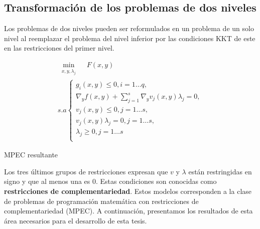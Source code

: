 \subsection{Transformación de los problemas de dos niveles}
		
		Los problemas de dos niveles pueden ser reformulados en un problema de un solo nivel al reemplazar el problema del nivel inferior por las condiciones KKT de este en las restricciones del primer nivel. 
		
        
       \begin{table}[H]
        \centering
        \begin{equation}
            \begin{array}{l}
                \underset{\substack{x, y, \lambda_j}}{\min} \quad F(x, y)\\
                s.a \left\{ 
                \begin{array}{l}
                    g_i(x, y) \leq 0, i=1\ldots q,\\
                    \nabla_{y} f(x, y) + \sum_{j=1}^{s} \nabla_{y} v_j(x, y) \lambda_j = 0, \\
                    v_j(x, y) \leq 0, j=1\ldots s,\\
                    v_j(x, y)\lambda_j = 0, j=1\ldots s, \\
                    \lambda_j \geq 0, j=1\ldots s\\
                \end{array}\right.
                \tag{\theequation}
            \end{array}
            \label{eq:KKT_Optimista}
        \end{equation}
        \caption*{MPEC resultante}

    \end{table}
    
Los tres últimos grupos de restricciones expresan que $v$ y $\lambda$ están restringidas en signo y que al menos una es 0. Estas condiciones son conocidas como \textbf{restricciones de complementariedad}. Estos modelos corresponden a la clase de problemas de programación matemática con restricciones de complementariedad (MPEC). A continuación, presentamos los resultados de esta área necesarios para el desarrollo de esta tesis.

